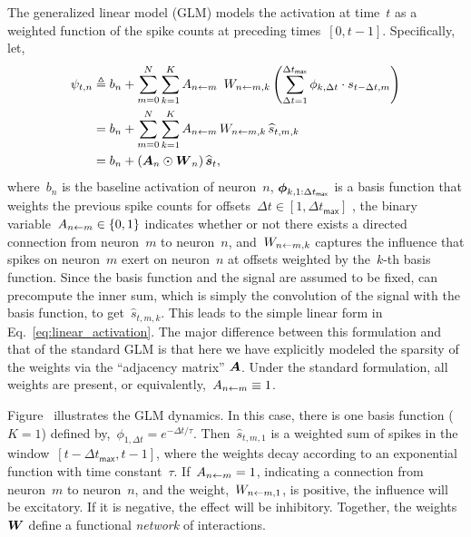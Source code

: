 The generalized linear model (GLM) \cite{Paninski-2004, Truccolo-2003, Pillow-2008} 
models the activation at time~$t$ as a weighted function of 
the spike counts at preceding times~${[0,t-1]}$. Specifically,
let,
\begin{align}
  \label{eq:glm_activation}
  \psi_{t,n} &\triangleq b_n  +                 
               \sum_{m=0}^N  \sum_{k=1}^K A_{n \from m} \, W_{n \from m,k}
               \left( \sum_{\Delta t=1}^{\Delta t_{\mathsf{max}}} \phi_{k, \Delta t} \cdot s_{t-\Delta t, m} \right) \\
             &= b_n  + \sum_{m=0}^N \sum_{k=1}^K A_{n \from m}  \, W_{n \from m,k} \, \widehat{s}_{t,m,k} \\
  \label{eq:linear_activation}
             &= b_n + (\bA_{n} \odot \bW_n) \, \widehat{\bs}_t,
\end{align}
where~$b_n$ is the baseline activation of neuron~$n$,
$\boldsymbol{\phi}_{k,1:\Delta t_{\mathsf{max}}}$ is a basis function 
that weights the previous spike counts for 
offsets~${\Delta t \in [1, \Delta t_{\mathsf{max}}]}$
, the binary variable~${A_{n \leftarrow m} \in \{0,1\}}$ 
indicates whether or not there exists 
a directed connection from neuron~$m$ to neuron~$n$,
and~$W_{n \leftarrow m,k}$ captures the influence that
spikes on neuron~$m$ exert on neuron~$n$ at
offsets weighted by the~$k$-th basis function.  
Since the basis function and the signal 
are assumed to be fixed,  can precompute the inner sum, which is simply the 
convolution of the signal with the basis function, to get~$\widehat{s}_{t,m,k}$.
This leads to the simple linear form in Eq.~\ref{eq:linear_activation}.
The major difference between this formulation and that of the standard 
GLM is that here we have explicitly modeled the sparsity of the 
weights via the ``adjacency matrix'' $\boldsymbol{A}$. Under the standard 
formulation, all weights are present, or equivalently,~${A_{n \leftarrow m} \equiv 1}$.

Figure~\TODO{} illustrates the GLM dynamics. In this case, there is
one basis function ($K=1$) defined
by,~${\phi_{1,\Delta t} = e^{-\Delta t/\tau}}$.
Then~$\widehat{s}_{t,m,1}$ is a weighted sum of spikes in the
window~$[t-\Delta t_{\mathsf{max}},t-1]$, where the weights decay
according to an exponential function with time constant~$\tau$.  
If~${A_{n \leftarrow m}=1}$, indicating a
connection from neuron~$m$ to neuron~$n$, and
the weight,~$W_{n \leftarrow m,1}$, is positive, the influence will be
excitatory. If it is negative, the effect will be inhibitory.
Together, the weights~$\boldsymbol{W}$ define a functional \emph{network} of
interactions.

